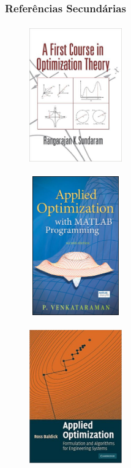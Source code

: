 \documentclass{beamer}
\begin{document}
\begin{frame}
\frametitle{Referências Secundárias}
\centering

{
	\begin{figure}[!htb]
		\includegraphics[width=4cm, height=6cm]{a-first-course-in-optimization-theory.jpg}
	\end{figure}
}

{
	\begin{figure}[!htb]
		\includegraphics[width=4cm, height=6cm]{Applied-Optimization-with-MATLAB-Programming-SDL069600218-1-c62c2.jpg}
	\end{figure}
}

{
	\begin{figure}[!htb]
		\includegraphics[width=4cm, height=6cm]{appliedoptmization.jpg}
	\end{figure}
}


\end{frame}
\end{document}
